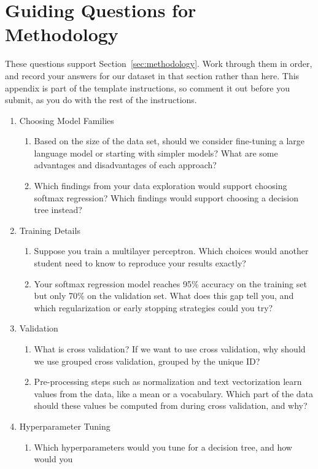 \documentclass[12pt]{article}
\begin{document}
\section{Guiding Questions for Methodology}\label{app:methodology}
These questions support Section~\ref{sec:methodology}. Work through them in order,
and record your answers for our dataset in that section rather than here. This
appendix is part of the template instructions, so comment it out before you submit,
as you do with the rest of the instructions.
\begin{enumerate}
\item Choosing Model Families
\begin{enumerate}
\item Based on the size of the data set, should we consider fine-tuning a large
language model or starting with simpler models? What are some advantages and
disadvantages of each approach?
\item Which findings from your data exploration would support choosing softmax
regression? Which findings would support choosing a decision tree instead?
\end{enumerate}
\item Training Details
\begin{enumerate}
\item Suppose you train a multilayer perceptron. Which choices would another
student need to know to reproduce your results exactly?
\item Your softmax regression model reaches 95\% accuracy on the training set but
only 70\% on the validation set. What does this gap tell you, and which
regularization or early stopping strategies could you try?
\end{enumerate}
\item Validation
\begin{enumerate}
\item What is cross validation? If we want to use cross validation, why should we
use grouped cross validation, grouped by the unique ID?
\item Pre-processing steps such as normalization and text vectorization learn
values from the data, like a mean or a vocabulary. Which part of the data should
these values be computed from during cross validation, and why?
\end{enumerate}
\item Hyperparameter Tuning
\begin{enumerate}
\item Which hyperparameters would you tune for a decision tree, and how would you

\end{enumerate}
\end{enumerate}
\end{document}
